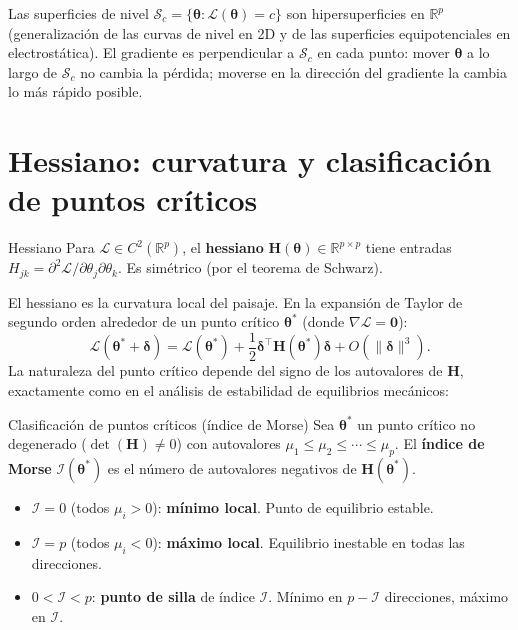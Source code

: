 Las superficies de nivel
$\mathcal{S}_c = \{\bm{\theta}: \mathcal{L}(\bm{\theta}) = c\}$ son
hipersuperficies en $\mathbb{R}^p$ (generalización de las curvas de
nivel en 2D y de las superficies equipotenciales en electrostática). El
gradiente es perpendicular a $\mathcal{S}_c$ en cada punto: mover
$\bm{\theta}$ a lo largo de $\mathcal{S}_c$ no cambia la pérdida;
moverse en la dirección del gradiente la cambia lo más rápido posible.

\section{Hessiano: curvatura y clasificación de puntos críticos}
\label{sec:hessiano}


\begin{definicion}{Hessiano}
\label{def:hessiano}
Para $\mathcal{L} \in C^2(\mathbb{R}^p)$, el \textbf{hessiano}
$\bm{H}(\bm{\theta}) \in \mathbb{R}^{p \times p}$ tiene entradas
$H_{jk} = \partial^2\mathcal{L}/\partial\theta_j\partial\theta_k$.
Es simétrico (por el teorema de Schwarz).
\end{definicion}

El hessiano es la curvatura local del paisaje. En la expansión de Taylor
de segundo orden alrededor de un punto crítico $\bm{\theta}^*$ (donde
$\nabla\mathcal{L} = \bm{0}$):
\begin{equation}
  \mathcal{L}(\bm{\theta}^* + \bm{\delta})
  = \mathcal{L}(\bm{\theta}^*)
  + \frac{1}{2}\bm{\delta}^\top\bm{H}(\bm{\theta}^*)\bm{\delta}
  + O(\|\bm{\delta}\|^3).
  \label{eq:taylor_hessiano}
\end{equation}
La naturaleza del punto crítico depende del signo de los autovalores
de $\bm{H}$, exactamente como en el análisis de estabilidad de
equilibrios mecánicos:

\begin{definicion}{Clasificación de puntos críticos (índice de Morse)}
\label{def:morse}
Sea $\bm{\theta}^*$ un punto crítico no degenerado
($\det(\bm{H}) \neq 0$) con autovalores
$\mu_1 \leq \mu_2 \leq \cdots \leq \mu_p$. El \textbf{índice de
Morse} $\mathcal{I}(\bm{\theta}^*)$ es el número de autovalores
negativos de $\bm{H}(\bm{\theta}^*)$.
\begin{itemize}
  \item $\mathcal{I} = 0$ (todos $\mu_i > 0$): \textbf{mínimo local}.
        Punto de equilibrio estable.
  \item $\mathcal{I} = p$ (todos $\mu_i < 0$): \textbf{máximo local}.
        Equilibrio inestable en todas las direcciones.
  \item $0 < \mathcal{I} < p$: \textbf{punto de silla} de índice
        $\mathcal{I}$. Mínimo en $p - \mathcal{I}$ direcciones,
        máximo en $\mathcal{I}$.
\end{itemize}
\end{definicion}

